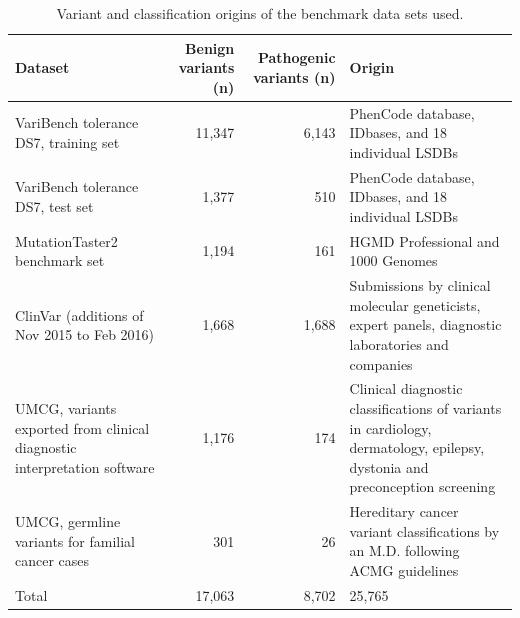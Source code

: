 \begin{table}
\begin{tabulary}{\linewidth}{LRRL}
  Dataset & Benign variants (n) & Patho\-genic variants (n) & Origin \\
  \hline
  \rule{0pt}{2.5ex}VariBench tolerance DS7, training set & 11,347 & 6,143 & PhenCode database, IDbases, and 18 individual LSDBs \\
  \rule{0pt}{2.5ex}VariBench tolerance DS7, test set & 1,377 & 510 & PhenCode database, IDbases, and 18 individual LSDBs \\
  \rule{0pt}{2.5ex}MutationTaster2 benchmark set & 1,194 & 161 & HGMD Professional and 1000 Genomes \\
  \rule{0pt}{2.5ex}ClinVar (additions of Nov 2015 to Feb 2016) & 1,668 & 1,688 & Submissions by clinical molecular geneticists, expert panels, diagnostic laboratories and companies \\
  \rule{0pt}{2.5ex}UMCG, variants exported from clinical diagnostic interpretation software & 1,176 & 174 & Clinical diagnostic classifications of variants in cardiology, dermatology, epilepsy, dystonia and preconception screening \\
  \rule{0pt}{2.5ex}UMCG, germline variants for familial cancer cases & 301 & 26 & Hereditary cancer variant classifications by an M.D. following ACMG guidelines \\
  \rule{0pt}{2.5ex}Total & 17,063 & 8,702 & 25,765 \\
  \hline
\end{tabulary}
\caption[Origins of the benchmark data sets used]{Variant and classification origins of the benchmark data sets used.}
\label{table:gavin_variantorigins}
\end{table}


